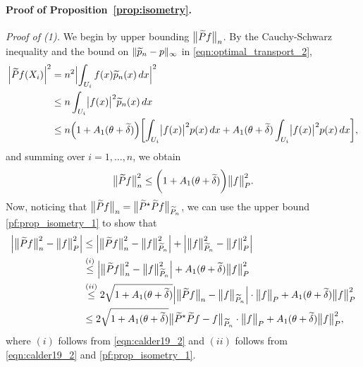 \paragraph{Proof of Proposition~\ref{prop:isometry}.}
\textit{Proof of (1).}
We begin by upper bounding $\bigl\|\widetilde{P}f\bigr\|_{n}$. By the Cauchy-Schwarz inequality and the bound on $\|\widetilde{p}_n - p\|_{\infty}$ in \eqref{eqn:optimal_transport_2},
\begin{align*}
\Bigl|\widetilde{P}f(X_i)\Bigr|^2 & = n^2 \Bigl|\int_{U_i} f(x) \widetilde{p}_n(x) \,dx\Bigr|^2 \\
& \leq n \int_{U_i} \bigl|f(x)\bigr|^2 \widetilde{p}_n(x) \,dx \\
& \leq n \Bigl(1 + A_1(\theta + \widetilde{\delta})\Bigr)\biggl[\int_{U_i} \bigl|f(x)\bigr|^2 p(x) \,dx + A_1(\theta + \widetilde{\delta}) \int_{U_i} \bigl|f(x)\bigr|^2 p(x) \,dx\biggr],
\end{align*}
and summing over $i = 1,\ldots,n$, we obtain
\begin{equation}
\label{pf:prop_isometry_1}
\bigl\|\widetilde{P}f\bigr\|_{n}^2 \leq \biggl(1 + A_1(\theta + \widetilde{\delta})\biggr) \bigl\|f\bigr\|_{P}^2.
\end{equation}
Now, noticing that $\bigl\|\widetilde{P}f\bigr\|_{n} = \bigl\|\widetilde{P}^{\star}\widetilde{P}f\bigr\|_{\widetilde{P}_n}$, we can use the upper bound \eqref{pf:prop_isometry_1} to show that
\begin{align}
\Bigl|\bigl\|\widetilde{P}f\bigr\|_{n}^2 - \bigl\|f\bigr\|_{P}^2\Bigr| & \leq \Bigl|\bigl\|\widetilde{P}f\bigr\|_{n}^2 - \bigl\|f\bigr\|_{\widetilde{P}_n}^2\Bigr| + \Bigl|\bigl\|f\bigr\|_{\widetilde{P}_n}^2 - \bigl\|f\bigr\|_{P}^2\Bigr| \nonumber \\
& \overset{(i)}{\leq} \Bigl|\bigl\|\widetilde{P}f\bigr\|_{n}^2 - \bigl\|f\bigr\|_{\widetilde{P}_n}^2\Bigr|  + A_1(\theta + \widetilde{\delta}) \bigl\|f\bigr\|_{P}^2 \\
& \overset{(ii)}{\leq} 2 \sqrt{1 + A_1(\theta + \widetilde{\delta})} \Bigl|\bigl\|\widetilde{P}f\bigr\|_{n} - \bigl\|f\bigr\|_{\widetilde{P}_n}\Bigr| \cdot \bigl\|f\bigr\|_{P} + A_1(\theta + \widetilde{\delta}) \bigl\|f\bigr\|_{P}^2 \nonumber \\
& \leq 2 \sqrt{1 + A_1(\theta + \widetilde{\delta})} \bigl\|\widetilde{P}^{\star}\widetilde{P}f - f\bigr\|_{\widetilde{P}_n} \cdot \bigl\|f\bigr\|_{P} + A_1(\theta + \widetilde{\delta}) \bigl\|f\bigr\|_{P}^2, \label{pf:prop_isometry_2}
\end{align}
where $(i)$ follows from \eqref{eqn:calder19_2} and $(ii)$ follows from \eqref{eqn:calder19_2} and  \eqref{pf:prop_isometry_1}. 

